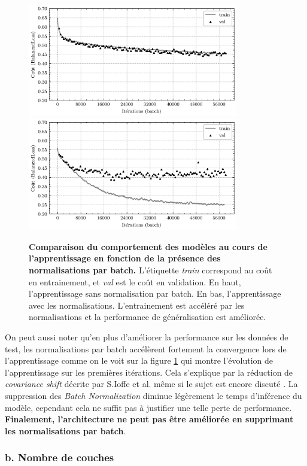 \documentclass[10pt,twocolumn,letterpaper,french]{article}
\begin{document}
\begin{figure}[!h]
  \centering
  \includegraphics[width=260pt]{images/BN/courbes_sansBN.png} 
  \includegraphics[width=260pt]{images/BN/courbes_avecBN.png} 
  \caption{\textbf{Comparaison du comportement des modèles au cours de l'apprentissage en fonction de la présence des normalisations par batch.} L'étiquette \textit{train} correspond au coût en entrainement, et \textit{val} est le coût en validation. En haut, l'apprentissage sans normalisation par batch. En bas, l'apprentissage avec les normalisations. L'entrainement est accéléré par les normalisations et la performance de généralisation est améliorée.}
  \label{courbes_BN_train}
  \end{figure}
  
On peut aussi noter qu'en plus d'améliorer la performance sur les données de test, les normalisations par batch accélèrent fortement la convergence lors de l'apprentissage comme on le voit sur la figure \ref{courbes_BN_train} qui montre l'évolution de l'apprentissage sur les premières itérations. Cela s'explique par la réduction de \textit{covariance shift} décrite par S.Ioffe et al. \cite{ioffe2015batch} même si le sujet est encore discuté \cite{santurkar2019does}. La suppression des \textit{Batch Normalization} diminue légèrement le temps d'inférence du modèle, cependant cela ne suffit pas à justifier une telle perte de performance. \textbf{Finalement, l'architecture ne peut pas être améliorée en supprimant les normalisations par batch}.


\subsubsection*{b. Nombre de couches}
\end{document}
